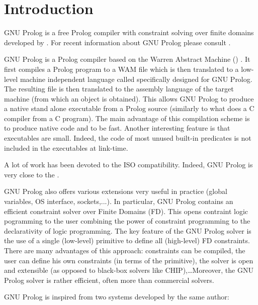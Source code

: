 \newpage
\section{Introduction}

GNU Prolog \cite{gnu-prolog} is a free Prolog compiler with constraint
solving over finite domains developed by
.  For recent
information about GNU Prolog please consult
.

 GNU Prolog is a Prolog compiler
based on the Warren Abstract Machine () \cite{Warren83,Ait-Kaci91}.
It first compiles a Prolog program to a WAM file which is then translated to
a low-level machine independent language called 
specifically designed for GNU Prolog. The resulting file is then translated
to the assembly language of the target machine (from which an object is
obtained). This allows GNU Prolog to produce a native stand alone executable
from a Prolog source (similarly to what does a C compiler from a C program).
The main advantage of this compilation scheme is to produce native code and
to be fast. Another interesting feature is that executables are small.
Indeed, the code of most unused built-in predicates is not included in the
executables at link-time.

A lot of work has been devoted to the ISO compatibility. Indeed, GNU Prolog
is very close to the
 \cite{iso-part1}.

GNU Prolog also offers various extensions very useful in practice (global
variables, OS interface, sockets,...). In particular, GNU Prolog contains an
efficient constraint solver over Finite Domains (FD). This opens contraint
logic pogramming to the user combining the power of constraint programming to
the declarativity of logic programming. The key feature of the GNU Prolog
solver is the use of a single (low-level) primitive to define all
(high-level) FD constraints. There are many advantages of this approach:
constraints can be compiled, the user can define his own constraints (in
terms of the primitive), the solver is open and extensible (as opposed to
black-box solvers like CHIP),\ldots Moreover, the GNU Prolog solver is rather
efficient, often more than commercial solvers.

GNU Prolog is inspired from two systems developed by the same author:

